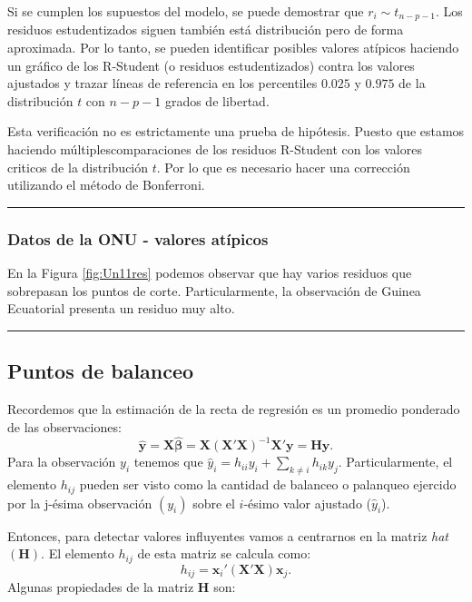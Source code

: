 \documentclass[
]{article}
\begin{document}
Si se cumplen los supuestos del modelo, se puede demostrar que \(r_{i}\sim t_{n-p-1}\). Los residuos estudentizados siguen también está distribución pero de forma aproximada. Por lo tanto, se pueden identificar posibles valores atípicos haciendo un gráfico de los R-Student (o residuos estudentizados) contra los valores ajustados y trazar líneas de referencia en los percentiles \(0.025\) y \(0.975\) de la distribución \(t\) con \(n-p-1\) grados de libertad.

Esta verificación no es estrictamente una prueba de hipótesis. Puesto que estamos haciendo múltiplescomparaciones de los residuos R-Student con los valores criticos de la distribución \(t\). Por lo que es necesario hacer una corrección utilizando el método de Bonferroni.

\rule{\textwidth}{0.4pt}

\hypertarget{datos-de-la-onu---valores-atuxedpicos}{%
\subsubsection*{Datos de la ONU - valores atípicos}\label{datos-de-la-onu---valores-atuxedpicos}}

En la Figura \ref{fig:Un11res} podemos observar que hay varios residuos que sobrepasan los puntos de corte. Particularmente, la observación de Guinea Ecuatorial presenta un residuo muy alto.

\rule{\textwidth}{0.4pt}

\hypertarget{puntos-de-balanceo}{%
\subsection{Puntos de balanceo}\label{puntos-de-balanceo}}

Recordemos que la estimación de la recta de regresión es un promedio ponderado de las observaciones:
\[
\widehat{\boldsymbol y}= \boldsymbol X\widehat{\boldsymbol \beta}= \boldsymbol X(\boldsymbol X'\boldsymbol X)^{-1}\boldsymbol X'\boldsymbol y= \boldsymbol H\boldsymbol y.
\]
Para la observación \(y_{i}\) tenemos que \(\widehat{y}_{i} = h_{ii}y_{i} + \sum_{k\neq i}h_{ik}y_{j}\). Particularmente, el elemento \(h_{ij}\) pueden ser visto como la cantidad de balanceo o palanqueo ejercido por la j-ésima observación \((y_i)\) sobre el \(i\)-ésimo valor ajustado (\(\widehat{y}_{i}\)).

Entonces, para detectar valores influyentes vamos a centrarnos en la matriz \textit{hat} \((\boldsymbol H)\). El elemento \(h_{ij}\) de esta matriz se calcula como:
\begin{equation}
h_{ij} = \boldsymbol x_{i}'(\boldsymbol X'\boldsymbol X)\boldsymbol x_{j}.
\label{eq:hij}
\end{equation}
Algunas propiedades de la matriz \(\boldsymbol H\) son:
\end{document}
